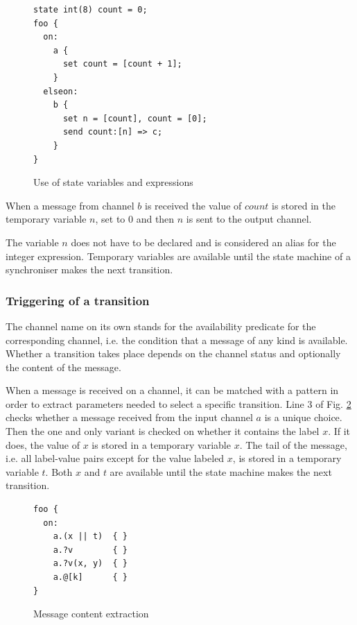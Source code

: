 \begin{figure}[h!]
\lstset{numbers=left, numberstyle=\small, stepnumber=1, numbersep=8pt}
\begin{lstlisting}[frame=single]
state int(8) count = 0;
foo {
  on:
    a {
      set count = [count + 1];
    }
  elseon:
    b {
      set n = [count], count = [0];
      send count:[n] => c;
    }
}
\end{lstlisting}
\caption{Use of state variables and expressions}
\label{sync_state_exp}
\end{figure}

When a message from channel $b$ is received the value of $count$ is stored in the temporary variable $n$, set to 0 and then $n$ is sent to the output channel.

The variable $n$ does not have to be declared and is considered an alias for the integer expression. Temporary variables are available until the state machine of a synchroniser makes the next transition.


  \subsubsection*{Triggering of a transition}
The channel name on its own stands for the availability predicate for the corresponding channel, i.e. the condition that a message of any kind is available. Whether a transition takes place depends on the channel status and optionally the content of the message.

When a message is received on a channel, it can be matched with a pattern in order to extract parameters needed to select a specific transition. Line 3 of Fig. \ref{sync_trans} checks whether a message received from the input channel $a$ is a unique choice. Then the one and only variant is checked on whether it contains the label $x$. If it does, the value of $x$ is stored in a temporary variable $x$. The tail of the message, i.e. all label-value pairs except for the value labeled $x$, is stored in a temporary variable $t$. Both $x$ and $t$ are available until the state machine makes the next transition.

\begin{figure}[h!]
\lstset{numbers=left, numberstyle=\small, stepnumber=1, numbersep=8pt}
\begin{lstlisting}[frame=single]
foo {
  on:
    a.(x || t)  { }
    a.?v        { }
    a.?v(x, y)  { }
    a.@[k]      { }
}
\end{lstlisting}
\caption{Message content extraction}
\label{sync_trans}
\end{figure}

